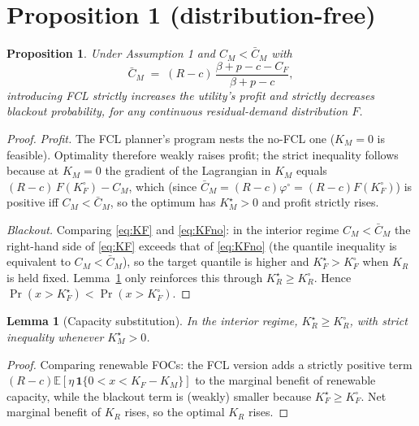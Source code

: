 \documentclass[11pt]{article}
\newtheorem{proposition}{Proposition}
\newtheorem{lemma}{Lemma}
\theoremstyle{definition}
\begin{document}
\section{Proposition 1 (distribution-free)}
\begin{proposition}\label{prop:1}
Under Assumption 1 and $C_M<\bar C_M$ with
\[
\bar C_M \;=\; (R-c)\,\frac{\beta+p-c-C_F}{\beta+p-c},
\]
introducing FCL strictly increases the utility's profit and strictly decreases blackout probability, for any continuous residual-demand distribution $F$.
\end{proposition}

\begin{proof}
\emph{Profit.} The FCL planner's program nests the no-FCL one ($K_M=0$ is feasible). Optimality therefore weakly raises profit; the strict inequality follows because at $K_M=0$ the gradient of the Lagrangian in $K_M$ equals $(R-c)\,F(K_F^{\circ})-C_M$, which (since $\bar C_M=(R-c)\varphi^{\circ}=(R-c)F(K_F^{\circ})$) is positive iff $C_M<\bar C_M$, so the optimum has $K_M^{\star}>0$ and profit strictly rises.

\emph{Blackout.} Comparing \eqref{eq:KF} and \eqref{eq:KFno}: in the interior regime $C_M<\bar C_M$ the right-hand side of \eqref{eq:KF} exceeds that of \eqref{eq:KFno} (the quantile inequality is equivalent to $C_M<\bar C_M$), so the target quantile is higher and $K_F^{\star}>K_F^{\circ}$ when $K_R$ is held fixed. Lemma~\ref{lem:sub} only reinforces this through $K_R^{\star}\ge K_R^{\circ}$. Hence $\Pr(x>K_F^{\star})<\Pr(x>K_F^{\circ})$.
\end{proof}

\begin{lemma}[Capacity substitution]\label{lem:sub}
In the interior regime, $K_R^{\star}\ge K_R^{\circ}$, with strict inequality whenever $K_M^{\star}>0$.
\end{lemma}

\begin{proof}
Comparing renewable FOCs: the FCL version adds a strictly positive term $(R-c)\mathbb E[\eta\,\mathbf 1\{0<x<K_F-K_M\}]$ to the marginal benefit of renewable capacity, while the blackout term is (weakly) smaller because $K_F^{\star}\ge K_F^{\circ}$. Net marginal benefit of $K_R$ rises, so the optimal $K_R$ rises.
\end{proof}
\end{document}
